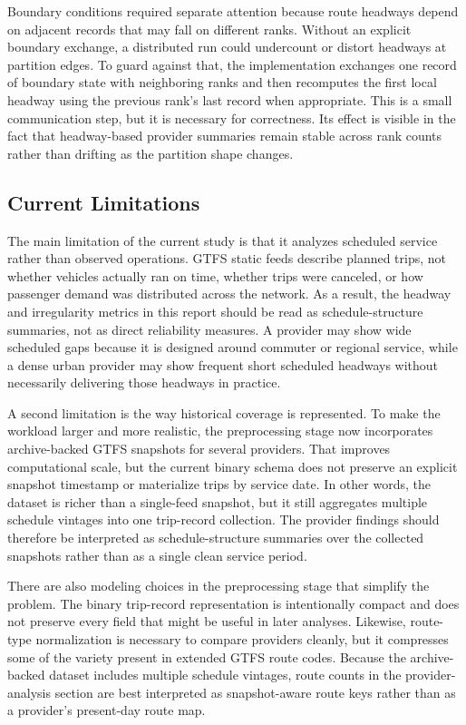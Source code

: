 \documentclass[sigconf,nonacm]{acmart}
\begin{document}
Boundary conditions required separate attention because route headways depend on adjacent records that may fall on different ranks. Without an explicit boundary exchange, a distributed run could undercount or distort headways at partition edges. To guard against that, the implementation exchanges one record of boundary state with neighboring ranks and then recomputes the first local headway using the previous rank's last record when appropriate. This is a small communication step, but it is necessary for correctness. Its effect is visible in the fact that headway-based provider summaries remain stable across rank counts rather than drifting as the partition shape changes.

\subsection{Current Limitations}
The main limitation of the current study is that it analyzes scheduled service rather than observed operations. GTFS static feeds describe planned trips, not whether vehicles actually ran on time, whether trips were canceled, or how passenger demand was distributed across the network. As a result, the headway and irregularity metrics in this report should be read as schedule-structure summaries, not as direct reliability measures. A provider may show wide scheduled gaps because it is designed around commuter or regional service, while a dense urban provider may show frequent short scheduled headways without necessarily delivering those headways in practice.

A second limitation is the way historical coverage is represented. To make the workload larger and more realistic, the preprocessing stage now incorporates archive-backed GTFS snapshots for several providers. That improves computational scale, but the current binary schema does not preserve an explicit snapshot timestamp or materialize trips by service date. In other words, the dataset is richer than a single-feed snapshot, but it still aggregates multiple schedule vintages into one trip-record collection. The provider findings should therefore be interpreted as schedule-structure summaries over the collected snapshots rather than as a single clean service period.

There are also modeling choices in the preprocessing stage that simplify the problem. The binary trip-record representation is intentionally compact and does not preserve every field that might be useful in later analyses. Likewise, route-type normalization is necessary to compare providers cleanly, but it compresses some of the variety present in extended GTFS route codes. Because the archive-backed dataset includes multiple schedule vintages, route counts in the provider-analysis section are best interpreted as snapshot-aware route keys rather than as a provider's present-day route map.
\end{document}
